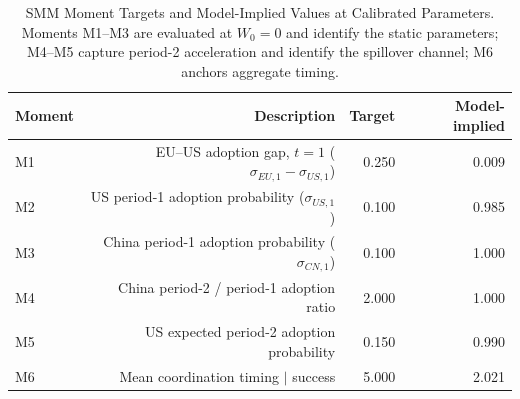 \begin{table}[htbp]
\centering
\small
\caption{SMM Moment Targets and Model-Implied Values at Calibrated Parameters. Moments M1--M3 are evaluated at $W_0 = 0$ and identify the static parameters; M4--M5 capture period-2 acceleration and identify the spillover channel; M6 anchors aggregate timing.}
\label{tab:smm_moments}
\begin{tabular}{lrrr}
\toprule
\textbf{Moment} & \textbf{Description} & \textbf{Target} & \textbf{Model-implied} \\
\midrule
M1 & EU--US adoption gap, $t=1$ ($\sigma_{EU,1} - \sigma_{US,1}$) & 0.250 & 0.009 \\
M2 & US period-1 adoption probability ($\sigma_{US,1}$) & 0.100 & 0.985 \\
M3 & China period-1 adoption probability ($\sigma_{CN,1}$) & 0.100 & 1.000 \\
M4 & China period-2 / period-1 adoption ratio & 2.000 & 1.000 \\
M5 & US expected period-2 adoption probability & 0.150 & 0.990 \\
M6 & Mean coordination timing $\mid$ success & 5.000 & 2.021 \\
\bottomrule
\end{tabular}
\end{table}